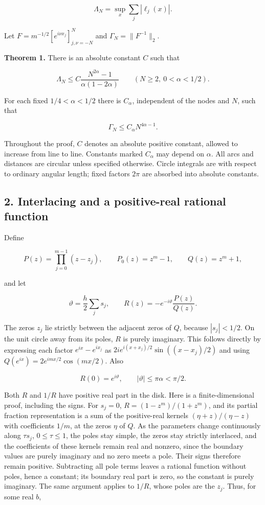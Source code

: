 \documentclass[10pt,a4paper]{article}
\begin{document}
\nopagebreak[4]
\[\Lambda_N=\sup_x\sum_j|\ell_j(x)|.\]

Let \(F=m^{-1/2}[e^{i\nu x_j}]_{j,\nu=-N}^N\) and
\(\Gamma_N=\|F^{-1}\|_2\).

\textbf{Theorem 1.} There is an absolute constant \(C\) such that

\nopagebreak[4]
\[\Lambda_N\le C\frac{N^{2\alpha}-1}{\alpha(1-2\alpha)} \qquad (N\ge2,\ 0<\alpha<1/2). \tag{1}\]

For each fixed \(1/4<\alpha<1/2\) there is \(C_\alpha\), independent of
the nodes and \(N\), such that

\nopagebreak[4]
\[\Gamma_N\le C_\alpha N^{4\alpha-1}. \tag{2}\]

Throughout the proof, \(C\) denotes an absolute positive constant,
allowed to increase from line to line. Constants marked \(C_\alpha\) may
depend on \(\alpha\). All arcs and distances are circular unless
specified otherwise. Circle integrals are with respect to ordinary
angular length; fixed factors \(2\pi\) are absorbed into absolute
constants.

\newpage
\subsection{2. Interlacing and a positive-real rational
function}\label{interlacing-and-a-positive-real-rational-function}

Define

\nopagebreak[4]
\[P(z)=\prod_{j=0}^{m-1}(z-z_j),\qquad P_0(z)=z^m-1,\qquad Q(z)=z^m+1,\]

and let

\nopagebreak[4]
\[\vartheta=\frac h2\sum_j s_j,\qquad R(z)=-e^{-i\vartheta}\frac{P(z)}{Q(z)}. \tag{3}\]

The zeros \(z_j\) lie strictly between the adjacent zeros of \(Q\),
because \(|s_j|<1/2\). On the unit circle away from its poles, \(R\) is
purely imaginary. This follows directly by expressing each factor
\(e^{ix}-e^{ix_j}\) as \(2ie^{i(x+x_j)/2}\sin((x-x_j)/2)\) and using
\(Q(e^{ix})=2e^{imx/2}\cos(mx/2)\). Also

\nopagebreak[4]
\[R(0)=e^{i\vartheta},\qquad |\vartheta|\le\pi\alpha<\pi/2. \tag{4}\]

Both \(R\) and \(1/R\) have positive real part in the disk. Here is a
finite-dimensional proof, including the signs. For \(s_j=0\),
\(R=(1-z^m)/(1+z^m)\), and its partial fraction representation is a sum
of the positive-real kernels \((\eta+z)/(\eta-z)\) with coefficients
\(1/m\), at the zeros \(\eta\) of \(Q\). As the parameters change
continuously along \(\tau s_j\), \(0\le\tau\le1\), the poles stay
simple, the zeros stay strictly interlaced, and the coefficients of
these kernels remain real and nonzero, since the boundary values are
purely imaginary and no zero meets a pole. Their signs therefore remain
positive. Subtracting all pole terms leaves a rational function without
poles, hence a constant; its boundary real part is zero, so the constant
is purely imaginary. The same argument applies to \(1/R\), whose poles
are the \(z_j\). Thus, for some real \(b\),
\end{document}
